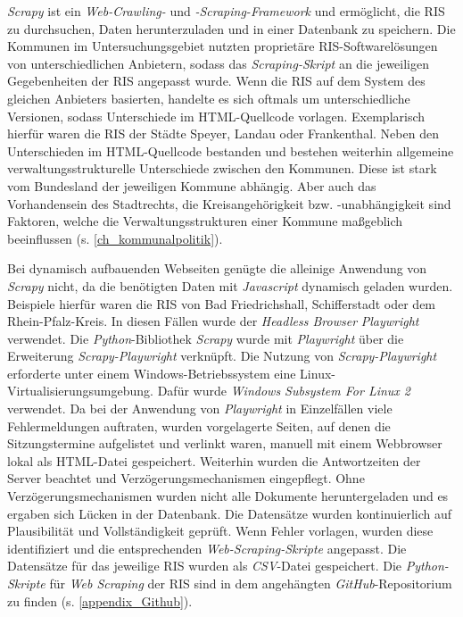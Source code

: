 \textit{Scrapy} ist ein \textit{Web-Crawling-} und \textit{-Scraping-Framework} und ermöglicht, die RIS zu durchsuchen, Daten herunterzuladen und in einer Datenbank zu speichern. Die Kommunen im Untersuchungsgebiet nutzten proprietäre RIS-Softwarelösungen von unterschiedlichen Anbietern, sodass das \textit{Scraping-Skript} an die jeweiligen Gegebenheiten der RIS angepasst wurde. Wenn die RIS auf dem System des gleichen Anbieters basierten, handelte es sich oftmals um unterschiedliche Versionen, sodass Unterschiede im HTML-Quellcode vorlagen. Exemplarisch hierfür waren die RIS der Städte Speyer, Landau oder Frankenthal. Neben den Unterschieden im HTML-Quellcode bestanden und bestehen weiterhin allgemeine verwaltungsstrukturelle Unterschiede zwischen den Kommunen. Diese ist stark vom Bundesland der jeweiligen Kommune abhängig. Aber auch das Vorhandensein des Stadtrechts, die Kreisangehörigkeit bzw. -unabhängigkeit sind Faktoren, welche die Verwaltungsstrukturen einer Kommune maßgeblich beeinflussen (s. \autoref{ch_kommunalpolitik}). 

Bei dynamisch aufbauenden Webseiten genügte die alleinige Anwendung von \textit{Scrapy} nicht, da die benötigten Daten mit \textit{Javascript} dynamisch geladen wurden. Beispiele hierfür waren die RIS von Bad Friedrichshall, Schifferstadt oder dem Rhein-Pfalz-Kreis. In diesen Fällen wurde der \textit{Headless Browser} \textit{Playwright} verwendet. Die \textit{Python}-Bibliothek \textit{Scrapy} wurde mit \textit{Playwright} über die Erweiterung \textit{Scrapy-Playwright} verknüpft. Die Nutzung von \textit{Scrapy-Playwright} erforderte unter einem Windows-Betriebssystem eine Linux-Virtualisierungsumgebung. Dafür wurde \textit{Windows Subsystem For Linux 2} verwendet. Da bei der Anwendung von \textit{Playwright} in Einzelfällen viele Fehlermeldungen auftraten, wurden vorgelagerte Seiten, auf denen die Sitzungstermine aufgelistet und verlinkt waren, manuell mit einem Webbrowser lokal als HTML-Datei gespeichert. Weiterhin wurden die Antwortzeiten der Server beachtet und Verzögerungsmechanismen eingepflegt. Ohne Verzögerungsmechanismen wurden nicht alle Dokumente heruntergeladen und es ergaben sich Lücken in der Datenbank. Die Datensätze wurden kontinuierlich auf Plausibilität und Vollständigkeit geprüft. Wenn Fehler vorlagen, wurden diese identifiziert und die entsprechenden \textit{Web-Scraping-Skripte} angepasst. Die Datensätze für das jeweilige RIS wurden als \textit{CSV}-Datei gespeichert. Die \textit{Python-Skripte} für \textit{Web Scraping} der RIS sind in dem angehängten \textit{GitHub}-Repositorium zu finden (s. \autoref{appendix_Github}).

